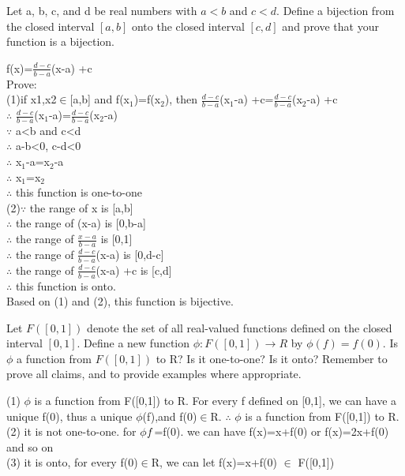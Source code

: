 \documentclass[11pt, a4paper, UTF8]{ctexart}
\begin{document}
\begin{problem}[UD:14.12]
Let a, b, c, and d be real numbers with \(a < b\) and \(c < d\). Define a bijection from the closed interval \([a,b]\) onto the closed interval \([c,d]\) and prove that your function is a bijection.
\end{problem}
\begin{solution}
f(x)=$\frac{d-c}{b-a}$(x-a) +c\\
Prove:\\
(1)if x1,x2$\in$[a,b] and f(x$_1$)=f(x$_2$), then $\frac{d-c}{b-a}$(x$_1$-a) +c=$\frac{d-c}{b-a}$(x$_2$-a) +c\\
$\therefore$ $\frac{d-c}{b-a}$(x$_1$-a)=$\frac{d-c}{b-a}$(x$_2$-a) \\
$\because$ a<b and c<d\\
$\therefore$ a-b<0, c-d<0\\
$\therefore$ x$_1$-a=x$_2$-a\\
$\therefore$ x$_1$=x$_2$\\
$\therefore$ this function is one-to-one\\
(2)$\because$ the range of x is [a,b]\\
$\therefore$ the range of (x-a) is [0,b-a]\\
$\therefore$ the range of $\frac{x-a}{b-a}$ is [0,1]\\
$\therefore$ the range of $\frac{d-c}{b-a}$(x-a) is [0,d-c]\\
$\therefore$ the range of $\frac{d-c}{b-a}$(x-a) +c is [c,d]\\
$\therefore$ this function is onto.\\
Based on (1) and (2), this function is bijective.\\
\end{solution}


\begin{problem}[UD:14.13]
Let \(F([0,1])\) denote the set of all real-valued functions defined on the closed interval \([0,1]\). Define a new function \(\phi:F([0,1]) \rightarrow R\) by \(\phi(f) = f(0)\). Is \(\phi\) a function from \(F([0,1])\) to R? Is it one-to-one? Is it onto? Remember to prove all claims, and to provide examples where appropriate.
\end{problem}
\begin{solution}
(1) $\phi$ is a function from F([0,1]) to R. For every f defined on [0,1], we can have a unique f(0), thus a unique $\phi$(f),and f(0)$\in$R. $\therefore$ $\phi$ is a function from F([0,1]) to R.\\
(2) it is not one-to-one. for $\phi$$\mathnormal{f}$=f(0). we can have f(x)=x+f(0) or f(x)=2x+f(0) and so on\\
(3) it is onto, for every f(0)$\in$R, we can let f(x)=x+f(0) $\in$ F([0,1])\\
\end{solution}
\end{document}
